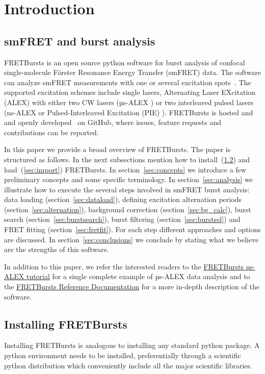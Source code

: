 \section{Introduction}

\subsection{smFRET and burst analysis}

FRETBursts is an open source python software for burst analysis of confocal 
single-molecule Förster Resonance Energy Transfer (smFRET) data. The software can analyze smFRET measurements
with one or several excitation spots~\cite{Ingargiola_2013}. The supported 
excitation schemes include single lasers, Alternating Laser EXcitation (ALEX) with either two CW lasers (µs-ALEX \cite{Kapanidis_2005}) 
or two interleaved pulsed lasers (ns-ALEX \cite{16287971} or Pulsed-Interleaved Excitation (PIE) \cite{M_ller_2005}). 
FRETBursts is hosted and and openly developed~\cite{Prli__2012} on GitHub, where
issues, feature requests and contributions can be reported.

In this paper we provide a broad overview of FRETBursts. 
The paper is structured as follows. 
In the next subsections mention how to install~(\ref{sec:install}) and 
load~(\ref{sec:import}) FRETBursts.
In section~\ref{sec:concepts} we
introduce a few preliminary concepts and some specific terminology.
In section~\ref{sec:analysis} we illustrate how to execute the several steps involved
in smFRET burst analysis: data loading (section~\ref{sec:dataload}), defining 
excitation alternation periods (section~\ref{sec:alternation}), background 
correction (section~\ref{sec:bg_calc}), burst search (section~\ref{sec:burstsearch}), 
burst filtering (section~\ref{sec:burstsel}) and FRET fitting (section~\ref{sec:fretfit}). 
For each step different approaches and options are discussed. 
In section~\ref{sec:conclusions} we conclude by stating what we believe are
the strengths of this software.

In addition to this paper, we refer the interested readers to the 
\href{http://nbviewer.ipython.org/github/tritemio/FRETBursts_notebooks/blob/master/notebooks/FRETBursts\%20-\%20us-ALEX\%20smFRET\%20burst\%20analysis.ipynb}{FRETBursts µs-ALEX tutorial} 
for a single complete example of µs-ALEX data analysis and to the
\href{http://fretbursts.readthedocs.org/}{FRETBursts Reference Documentation}
for a more in-depth description of the software.

\subsection{Installing FRETBursts}
\label{sec:install}
Installing FRETBursts is analogous to installing any standard python
package. A python environment needs to be installed, preferentially
through a scientific python distribution which conveniently include 
all the major scientific libraries.

